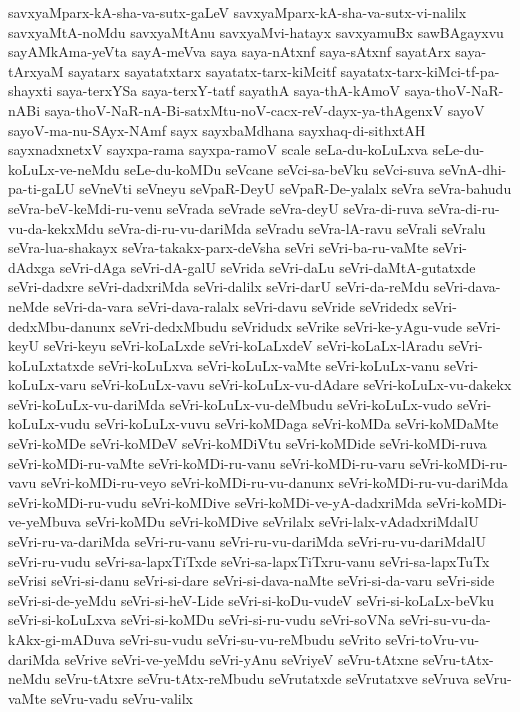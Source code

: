 {savxyaMparx-kA-sha-va-sutx-gaLeV
savxyaMparx-kA-sha-va-sutx-vi-nalilx
savxyaMtA-noMdu
savxyaMtAnu
savxyaMvi-hatayx
savxyamuBx
sawBAgayxvu
sayAMkAma-yeVta
sayA-meVva
saya
saya-nAtxnf
saya-sAtxnf
sayatArx
saya-tArxyaM
sayatarx
sayatatxtarx
sayatatx-tarx-kiMcitf
sayatatx-tarx-kiMci-tf-pa-shayxti
saya-terxYSa
saya-terxY-tatf
sayathA
saya-thA-kAmoV
saya-thoV-NaR-nABi
saya-thoV-NaR-nA-Bi-satxMtu-noV-cacx-reV-dayx-ya-thAgenxV
sayoV
sayoV-ma-nu-SAyx-NAmf
sayx
sayxbaMdhana
sayxhaq-di-sithxtAH
sayxnadxnetxV
sayxpa-rama
sayxpa-ramoV
scale
seLa-du-koLuLxva
seLe-du-koLuLx-ve-neMdu
seLe-du-koMDu
seVcane
seVci-sa-beVku
seVci-suva
seVnA-dhi-pa-ti-gaLU
seVneVti
seVneyu
seVpaR-DeyU
seVpaR-De-yalalx
seVra
seVra-bahudu
seVra-beV-keMdi-ru-venu
seVrada
seVrade
seVra-deyU
seVra-di-ruva
seVra-di-ru-vu-da-kekxMdu
seVra-di-ru-vu-dariMda
seVradu
seVra-lA-ravu
seVrali
seVralu
seVra-lua-shakayx
seVra-takakx-parx-deVsha
seVri
seVri-ba-ru-vaMte
seVri-dAdxga
seVri-dAga
seVri-dA-galU
seVrida
seVri-daLu
seVri-daMtA-gutatxde
seVri-dadxre
seVri-dadxriMda
seVri-dalilx
seVri-darU
seVri-da-reMdu
seVri-dava-neMde
seVri-da-vara
seVri-dava-ralalx
seVri-davu
seVride
seVridedx
seVri-dedxMbu-danunx
seVri-dedxMbudu
seVridudx
seVrike
seVri-ke-yAgu-vude
seVri-keyU
seVri-keyu
seVri-koLaLxde
seVri-koLaLxdeV
seVri-koLaLx-lAradu
seVri-koLuLxtatxde
seVri-koLuLxva
seVri-koLuLx-vaMte
seVri-koLuLx-vanu
seVri-koLuLx-varu
seVri-koLuLx-vavu
seVri-koLuLx-vu-dAdare
seVri-koLuLx-vu-dakekx
seVri-koLuLx-vu-dariMda
seVri-koLuLx-vu-deMbudu
seVri-koLuLx-vudo
seVri-koLuLx-vudu
seVri-koLuLx-vuvu
seVri-koMDaga
seVri-koMDa
seVri-koMDaMte
seVri-koMDe
seVri-koMDeV
seVri-koMDiVtu
seVri-koMDide
seVri-koMDi-ruva
seVri-koMDi-ru-vaMte
seVri-koMDi-ru-vanu
seVri-koMDi-ru-varu
seVri-koMDi-ru-vavu
seVri-koMDi-ru-veyo
seVri-koMDi-ru-vu-danunx
seVri-koMDi-ru-vu-dariMda
seVri-koMDi-ru-vudu
seVri-koMDive
seVri-koMDi-ve-yA-dadxriMda
seVri-koMDi-ve-yeMbuva
seVri-koMDu
seVri-koMDive
seVrilalx
seVri-lalx-vAdadxriMdalU
seVri-ru-va-dariMda
seVri-ru-vanu
seVri-ru-vu-dariMda
seVri-ru-vu-dariMdalU
seVri-ru-vudu
seVri-sa-lapxTiTxde
seVri-sa-lapxTiTxru-vanu
seVri-sa-lapxTuTx
seVrisi
seVri-si-danu
seVri-si-dare
seVri-si-dava-naMte
seVri-si-da-varu
seVri-side
seVri-si-de-yeMdu
seVri-si-heV-Lide
seVri-si-koDu-vudeV
seVri-si-koLaLx-beVku
seVri-si-koLuLxva
seVri-si-koMDu
seVri-si-ru-vudu
seVri-soVNa
seVri-su-vu-da-kAkx-gi-mADuva
seVri-su-vudu
seVri-su-vu-reMbudu
seVrito
seVri-toVru-vu-dariMda
seVrive
seVri-ve-yeMdu
seVri-yAnu
seVriyeV
seVru-tAtxne
seVru-tAtx-neMdu
seVru-tAtxre
seVru-tAtx-reMbudu
seVrutatxde
seVrutatxve
seVruva
seVru-vaMte
seVru-vadu
seVru-valilx
}
